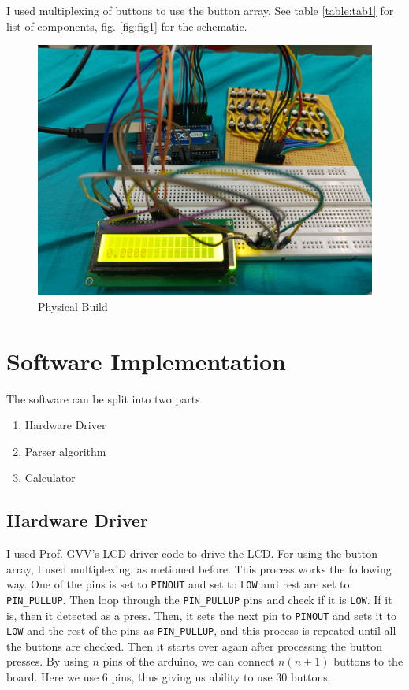 \documentclass[journal]{IEEEtran}
\begin{document}
I used multiplexing of buttons to use the button array. See table \ref{table:tab1} for list of components, fig. \ref{fig:fig1} for the schematic.

\begin{figure}
  \centering
  \includegraphics[width=1\linewidth]{figs/calcP.jpg}
  \caption{Physical Build}
\end{figure}

\section{Software Implementation}

The software can be split into two parts

\begin{enumerate}
  \item Hardware Driver
  \item Parser algorithm
  \item Calculator
\end{enumerate}

\subsection{Hardware Driver}

I used Prof. GVV's LCD driver code to drive the LCD. For using the button array, I used multiplexing, as metioned before. 
This process works the following way. One of the pins is set to \texttt{PINOUT} 
and set to \texttt{LOW} and rest are set to \texttt{PIN\_PULLUP}.
Then loop through the \texttt{PIN\_PULLUP} pins and check if it is \texttt{LOW}.
If it is, then it detected as a press.
Then, it sets the next pin to \texttt{PINOUT} and sets it to \texttt{LOW} and the rest of the pins as \texttt{PIN\_PULLUP}, and this process is repeated until all the buttons are checked.
Then it starts over again after processing the button presses.
By using $n$ pins of the arduino, we can connect $ n(n+1) $ buttons to the board. Here we use 6 pins, thus giving us ability to use 30 buttons.
\end{document}
